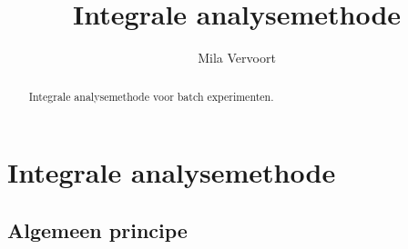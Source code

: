 \documentclass{ximera}
\title{Integrale analysemethode}
\author{Mila Vervoort}
\begin{document}
\begin{abstract}
    Integrale analysemethode voor batch experimenten.
\end{abstract}
\maketitle
\label{xim:Integrale analysemethode}

\section{Integrale analysemethode}
\label{Integrale analyse methode}
\subsection{Algemeen principe}
\end{document}
